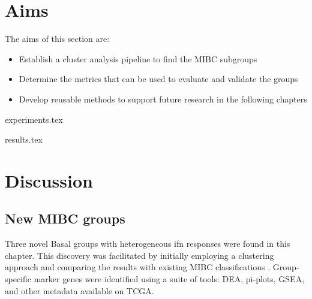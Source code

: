 
\section{Aims}

The aims of this section are:
\begin{itemize}
    \item Establish a cluster analysis pipeline to find the MIBC subgroups
    \item Determine the metrics that can be used to evaluate and validate the groups
    \item Develop reusable methods to support future research in the following chapters
\end{itemize}




{experiments.tex}

{results.tex}

\section{Discussion} \label{s:cs:discussion}

\subsection*{New MIBC groups}

Three novel Basal groups with heterogeneous \acrfull{ifn} responses were found in this chapter. This discovery was facilitated by initially employing a clustering approach and comparing the results with existing MIBC classifications \citep{Baker2022-bj,Marzouka2018-ge}. Group-specific marker genes were identified using a suite of tools: DEA, pi-plots, GSEA, and other metadata available on TCGA.

